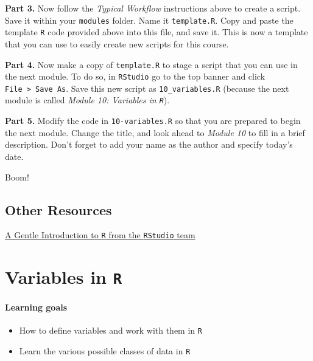 \documentclass[
]{book}
\providecommand{\tightlist}{%
  \setlength{\itemsep}{0pt}\setlength{\parskip}{0pt}}
\begin{document}
\textbf{Part 3.} Now follow the \emph{Typical Workflow} instructions above to create a script. Save it within your \texttt{modules} folder. Name it \texttt{template.R}. Copy and paste the template \texttt{R} code provided above into this file, and save it. This is now a template that you can use to easily create new scripts for this course.

\textbf{Part 4.} Now make a copy of \texttt{template.R} to stage a script that you can use in the next module. To do so, in \texttt{RStudio} go to the top banner and click \texttt{File\ \textgreater{}\ Save\ As}. Save this new script as \texttt{10\_variables.R} (because the next module is called \emph{Module 10: Variables in \texttt{R}}).

\textbf{Part 5.} Modify the code in \texttt{10-variables.R} so that you are prepared to begin the next module. Change the title, and look ahead to \emph{Module 10} to fill in a brief description. Don't forget to add your name as the author and specify today's date.

Boom!

\hypertarget{other-resources-1}{%
\section*{Other Resources}\label{other-resources-1}}

\href{https://www.rstudio.com/resources/webinars/a-gentle-introduction-to-tidy-statistics-in-r/}{A Gentle Introduction to \texttt{R} from the \texttt{RStudio} team}

\hypertarget{variables-in-r}{%
\chapter{\texorpdfstring{Variables in \texttt{R}}{Variables in R}}\label{variables-in-r}}

\hypertarget{learning-goals-2}{%
\subsubsection*{Learning goals}\label{learning-goals-2}}

\begin{itemize}
\tightlist
\item
  How to define variables and work with them in \texttt{R}\\
\item
  Learn the various possible classes of data in \texttt{R}
\end{itemize}
\end{document}

